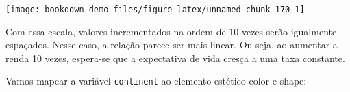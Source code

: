 \documentclass[]{book}
\newenvironment{Shaded}{\begin{snugshade}}{\end{snugshade}}
\newcommand{\KeywordTok}[1]{\textcolor[rgb]{0.13,0.29,0.53}{\textbf{#1}}}
\newcommand{\DataTypeTok}[1]{\textcolor[rgb]{0.13,0.29,0.53}{#1}}
\newcommand{\DecValTok}[1]{\textcolor[rgb]{0.00,0.00,0.81}{#1}}
\newcommand{\StringTok}[1]{\textcolor[rgb]{0.31,0.60,0.02}{#1}}
\newcommand{\OperatorTok}[1]{\textcolor[rgb]{0.81,0.36,0.00}{\textbf{#1}}}
\newcommand{\NormalTok}[1]{#1}
\begin{document}
\begin{Shaded}
\end{Shaded}

\begin{center}\texttt{[image: bookdown-demo\_files/figure-latex/unnamed-chunk-170-1]} \end{center}

Com essa escala, valores incrementados na ordem de 10 vezes serão
igualmente espaçados. Nesse caso, a relação parece ser mais linear. Ou
seja, ao aumentar a renda 10 vezes, espera-se que a expectativa de vida
cresça a uma taxa constante.

Vamos mapear a variável \texttt{continent} ao elemento estético color e
shape:
\end{document}
